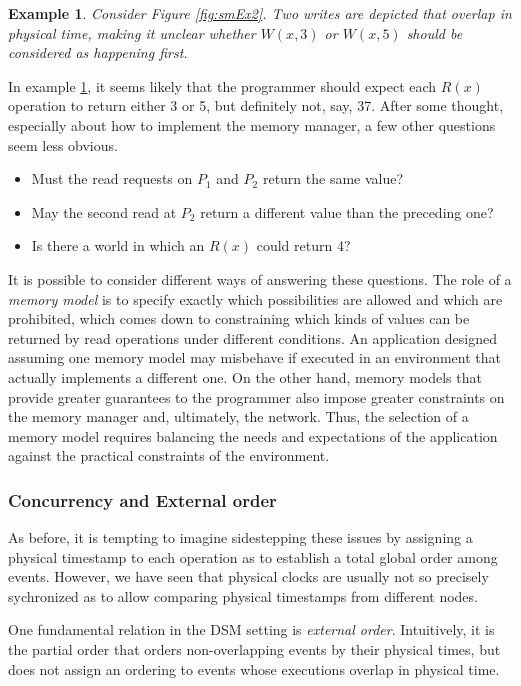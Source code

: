 \documentclass[]             %
{NASA}                       %
\newtheorem{example}{Example}
\theoremstyle{definition}
\begin{document}
\begin{example}
  \label{exmpl:concurrentupdates}
  Consider Figure \ref{fig:smEx2}. Two writes are depicted that overlap
  in physical time, making it unclear whether $W(x,3)$ or $W(x,5)$
  should be considered as happening first.
\end{example}

In example \ref{exmpl:concurrentupdates}, it seems likely that the
programmer should expect each $R(x)$ operation to return either 3 or
5, but definitely not, say, 37. After some thought, especially about
how to implement the memory manager, a few other questions seem less
obvious.
\begin{itemize}
\item Must the read requests on $P_1$ and $P_2$ return the same value?
\item May the second read at $P_2$ return a different value
  than the preceding one?
\item Is there a world in which an $R(x)$ could return 4?
\end{itemize}

It is possible to consider different ways of answering these
questions. The role of a \emph{memory model} is to specify exactly
which possibilities are allowed and which are prohibited, which comes
down to constraining which kinds of values can be returned by read
operations under different conditions. An application designed
assuming one memory model may misbehave if executed in an environment
that actually implements a different one. On the other hand, memory
models that provide greater guarantees to the programmer also impose
greater constraints on the memory manager and, ultimately, the
network. Thus, the selection of a memory model requires balancing the
needs and expectations of the application against the practical
constraints of the environment.

\subsubsection{Concurrency and External order}
\label{sssec:externalorder}
As before, it is tempting to imagine sidestepping these issues by
assigning a physical timestamp to each operation as to establish a
total global order among events. However, we have seen that physical
clocks are usually not so precisely sychronized as to allow comparing
physical timestamps from different nodes.

One fundamental relation in the DSM setting is \emph{external
order}. Intuitively, it is the partial order that orders
non-overlapping events by their physical times, but does not assign an
ordering to events whose executions overlap in physical time.
\end{document}

